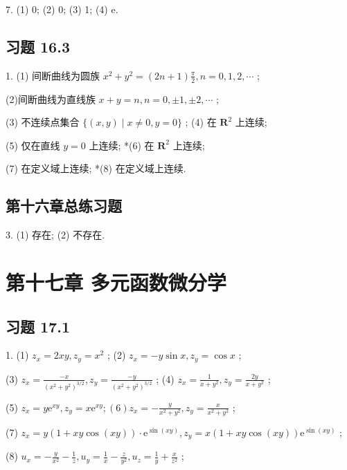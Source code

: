 7. (1) 0; (2) 0; (3) 1; (4) e.

\subsection{习题 16.3}

1. (1) 间断曲线为圆族 \({x}^{2} + {y}^{2} = \left( {{2n} + 1}\right) \frac{\pi }{2},n = 0,1,2,\cdots\) ;

(2)间断曲线为直线族 \(x + y = n,n = 0, \pm  1, \pm  2,\cdots\) ;

(3) 不连续点集合 \(\{ \left( {x,y}\right)  \mid  x \neq  0,y = 0\}\) ; (4) 在 \({\mathbf{R}}^{2}\) 上连续;

(5) 仅在直线 \(y = 0\) 上连续; *(6) 在 \({\mathbf{R}}^{2}\) 上连续;

(7) 在定义域上连续; *(8) 在定义域上连续.

\subsection{第十六章总练习题}

3. (1) 存在; (2) 不存在.

\section{第十七章 多元函数微分学}

\subsection{习题 17.1}

1. (1) \({z}_{x} = {2xy},{z}_{y} = {x}^{2}\) ; (2) \({z}_{x} =  - y\sin x,{z}_{y} = \cos x\) ;

(3) \({z}_{x} = \frac{-x}{{\left( {x}^{2} + {y}^{2}\right) }^{3/2}},{z}_{y} = \frac{-y}{{\left( {x}^{2} + {y}^{2}\right) }^{3/2}}\) ; (4) \({z}_{x} = \frac{1}{x + {y}^{2}},{z}_{y} = \frac{2y}{x + {y}^{2}}\) ;

(5) \({z}_{x} = y{\mathrm{e}}^{xy},{z}_{y} = x{\mathrm{e}}^{xy};\left( 6\right) {z}_{x} =  - \frac{y}{{x}^{2} + {y}^{2}},{z}_{y} = \frac{x}{{x}^{2} + {y}^{2}}\) ;

(7) \({z}_{x} = y\left( {1 + {xy}\cos \left( {xy}\right) }\right)  \cdot  {\mathrm{e}}^{\sin \left( {xy}\right) },{z}_{y} = x\left( {1 + {xy}\cos \left( {xy}\right) }\right) {\mathrm{e}}^{\sin \left( {xy}\right) }\) ;

(8) \({u}_{x} =  - \frac{y}{{x}^{2}} - \frac{1}{z},{u}_{y} = \frac{1}{x} - \frac{z}{{y}^{2}},{u}_{z} = \frac{1}{y} + \frac{x}{{z}^{2}}\) ;

